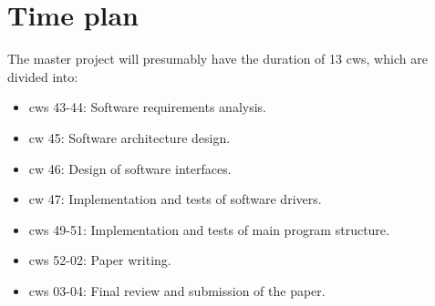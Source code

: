 %
%

\chapter{Time plan}
\label{chap:Time plan}
%
The master project will presumably have the duration of 13 \acp{cw}, which are divided into:

\begin{itemize}
    \item \acsp{cw} 43-44: Software requirements analysis.
    \item \acs{cw} 45: Software architecture design.
    \item \acs{cw} 46: Design of software interfaces.
    \item \acs{cw} 47: Implementation and tests of software drivers.
    \item \acsp{cw} 49-51: Implementation and tests of main program structure.
    \item \acsp{cw} 52-02: Paper writing.
    \item \acsp{cw} 03-04: Final review and submission of the paper.
\end{itemize}